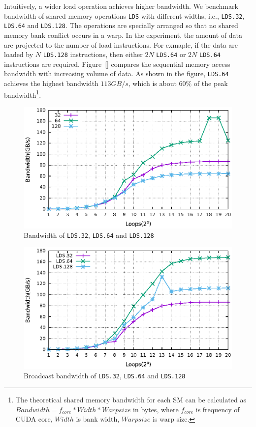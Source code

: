 \documentclass{sig-alternate-05-2015}
\begin{document}
Intuitively, a wider load operation achieves higher bandwidth. We benchmark bandwidth of shared memory operations {\tt LDS} with different widths, i.e., {\tt LDS.32}, {\tt LDS.64}
and {\tt LDS.128}. The operations are specially arranged so that no shared memory bank conflict occurs in a warp. In the experiment, the amount of data are projected to the number of load instructions. For exmaple, if the data are loaded by $N$ {\tt LDS.128} instructions, then either $2N$ {\tt LDS.64} or $2N$ {\tt LDS.64} instructions are required. Figure~\ref{} compares the sequential memory access bandwidth with increasing volume of data. As shown in the figure, {\tt LDS.64} achieves the highest bandwidth $113GB/s$, which is about $60\%$ of the peak bandwidth\footnote{The theoretical shared memory bandwidth for each SM can be calculated as $Bandwidth=f_{core}*Width*Warpsize$ in
bytes, where $f_{core}$ is frequency of CUDA core, $Width$ is bank width, $Warpsize$ is warp size.}.

\begin{figure}[htbp]
\begin{center}
\includegraphics[scale=0.6]{lds_bandwidth}
    \caption{ Bandwidth of {\tt LDS.32}, {\tt LDS.64} and {\tt LDS.128}}
\label{fig:lds_bw}
\end{center}
\end{figure}

\begin{figure}[htbp]
\begin{center}
\includegraphics[scale=0.6]{lds_broadcast_bandwidth}
    \caption{ Broadcast bandwidth of {\tt LDS.32}, {\tt LDS.64} and {\tt LDS.128}}
\label{fig:lds_brd_bw}
\end{center}
\end{figure}
\end{document}
